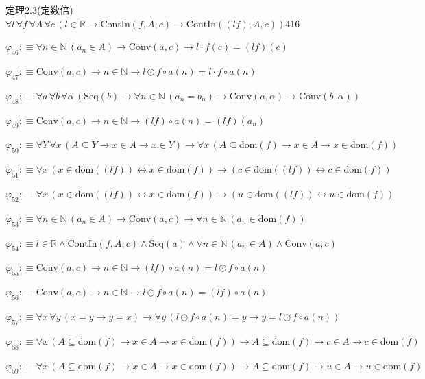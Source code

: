 \begin{fullproof}{定理2.3(定数倍)}{$\forall l\,\forall f\,\forall A\,\forall c\,(l \in \mathbb{R} \to \mathrm{ContIn}(f,A,c) \to \mathrm{ContIn}((l f),A,c))$}{416}
\begin{abbrevlist}
\item $\varphi_{46} :\equiv \forall n \in \mathbb{N}\,(a_{n} \in A) \to \mathrm{Conv}(a,c) \to l \cdot f(c) = (l f)(c)$
\item $\varphi_{47} :\equiv \mathrm{Conv}(a,c) \to n \in \mathbb{N} \to l \odot f \circ a(n) = l \cdot f \circ a(n)$
\item $\varphi_{48} :\equiv \forall a\,\forall b\,\forall \alpha\,(\mathrm{Seq}(b) \to \forall n \in \mathbb{N}\,(a_{n} = b_{n}) \to \mathrm{Conv}(a,\alpha) \to \mathrm{Conv}(b,\alpha))$
\item $\varphi_{49} :\equiv \mathrm{Conv}(a,c) \to n \in \mathbb{N} \to (l f) \circ a(n) = (l f)(a_{n})$
\item $\varphi_{50} :\equiv \forall Y\,\forall x\,(A \subseteq Y \to x \in A \to x \in Y) \to \forall x\,(A \subseteq \mathrm{dom}(f) \to x \in A \to x \in \mathrm{dom}(f))$
\item $\varphi_{51} :\equiv \forall x\,(x \in \mathrm{dom}((l f)) \leftrightarrow x \in \mathrm{dom}(f)) \to (c \in \mathrm{dom}((l f)) \leftrightarrow c \in \mathrm{dom}(f))$
\item $\varphi_{52} :\equiv \forall x\,(x \in \mathrm{dom}((l f)) \leftrightarrow x \in \mathrm{dom}(f)) \to (u \in \mathrm{dom}((l f)) \leftrightarrow u \in \mathrm{dom}(f))$
\item $\varphi_{53} :\equiv \forall n \in \mathbb{N}\,(a_{n} \in A) \to \mathrm{Conv}(a,c) \to \forall n \in \mathbb{N}\,(a_{n} \in \mathrm{dom}(f))$
\item $\varphi_{54} :\equiv l \in \mathbb{R} \land \mathrm{ContIn}(f,A,c) \land \mathrm{Seq}(a) \land \forall n \in \mathbb{N}\,(a_{n} \in A) \land \mathrm{Conv}(a,c)$
\item $\varphi_{55} :\equiv \mathrm{Conv}(a,c) \to n \in \mathbb{N} \to (l f) \circ a(n) = l \odot f \circ a(n)$
\item $\varphi_{56} :\equiv \mathrm{Conv}(a,c) \to n \in \mathbb{N} \to l \odot f \circ a(n) = (l f) \circ a(n)$
\item $\varphi_{57} :\equiv \forall x\,\forall y\,(x = y \to y = x) \to \forall y\,(l \odot f \circ a(n) = y \to y = l \odot f \circ a(n))$
\item $\varphi_{58} :\equiv \forall x\,(A \subseteq \mathrm{dom}(f) \to x \in A \to x \in \mathrm{dom}(f)) \to A \subseteq \mathrm{dom}(f) \to c \in A \to c \in \mathrm{dom}(f)$
\item $\varphi_{59} :\equiv \forall x\,(A \subseteq \mathrm{dom}(f) \to x \in A \to x \in \mathrm{dom}(f)) \to A \subseteq \mathrm{dom}(f) \to u \in A \to u \in \mathrm{dom}(f)$

\end{abbrevlist}
\end{fullproof}
